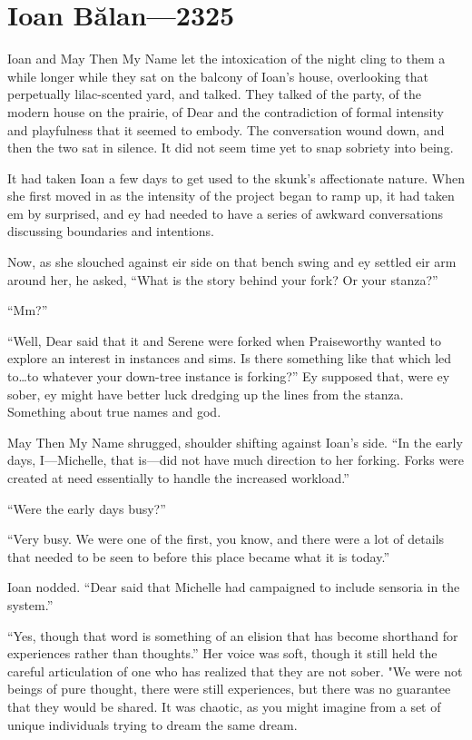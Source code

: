 \hypertarget{ioan-bux103lan-2325}{%
\chapter{Ioan Bălan---2325}\label{ioan-bux103lan-2325}}

Ioan and May Then My Name let the intoxication of the night cling to them a while longer while they sat on the balcony of Ioan's house, overlooking that perpetually lilac-scented yard, and talked. They talked of the party, of the modern house on the prairie, of Dear and the contradiction of formal intensity and playfulness that it seemed to embody. The conversation wound down, and then the two sat in silence. It did not seem time yet to snap sobriety into being.

It had taken Ioan a few days to get used to the skunk's affectionate nature. When she first moved in as the intensity of the project began to ramp up, it had taken em by surprised, and ey had needed to have a series of awkward conversations discussing boundaries and intentions.

Now, as she slouched against eir side on that bench swing and ey settled eir arm around her, he asked, ``What is the story behind your fork? Or your stanza?''

``Mm?''

``Well, Dear said that it and Serene were forked when Praiseworthy wanted to explore an interest in instances and sims. Is there something like that which led to\ldots to whatever your down-tree instance is forking?'' Ey supposed that, were ey sober, ey might have better luck dredging up the lines from the stanza. Something about true names and god.

May Then My Name shrugged, shoulder shifting against Ioan's side. ``In the early days, I---Michelle, that is---did not have much direction to her forking. Forks were created at need essentially to handle the increased workload.''

``Were the early days busy?''

``Very busy. We were one of the first, you know, and there were a lot of details that needed to be seen to before this place became what it is today.''

Ioan nodded. ``Dear said that Michelle had campaigned to include sensoria in the system.''

``Yes, though that word is something of an elision that has become shorthand for experiences rather than thoughts.'' Her voice was soft, though it still held the careful articulation of one who has realized that they are not sober. "We were not beings of pure thought, there were still experiences, but there was no guarantee that they would be shared. It was chaotic, as you might imagine from a set of unique individuals trying to dream the same dream.

